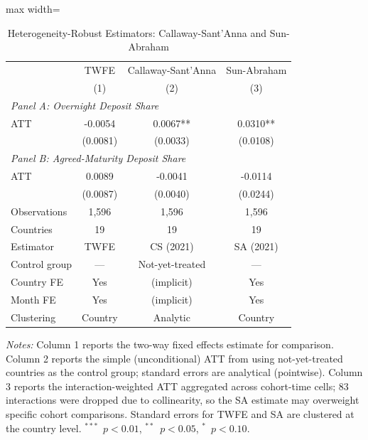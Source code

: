 \begin{table}[H]
\centering
\caption{Heterogeneity-Robust Estimators: Callaway-Sant'Anna and Sun-Abraham}
\label{tab:robust_estimators}
\begin{adjustbox}{max width=\textwidth}
\begin{tabular}{lccc}
\toprule
 & TWFE & Callaway-Sant'Anna & Sun-Abraham \\
 & (1) & (2) & (3) \\
\midrule
\multicolumn{4}{l}{\textit{Panel A: Overnight Deposit Share}} \\[3pt]
ATT & -0.0054 & 0.0067** & 0.0310** \\
 & (0.0081) & (0.0033) & (0.0108) \\
\midrule
\multicolumn{4}{l}{\textit{Panel B: Agreed-Maturity Deposit Share}} \\[3pt]
ATT & 0.0089 & -0.0041 & -0.0114 \\
 & (0.0087) & (0.0040) & (0.0244) \\
\midrule
Observations & 1,596 & 1,596 & 1,596 \\
Countries & 19 & 19 & 19 \\
Estimator & TWFE & CS (2021) & SA (2021) \\
Control group & --- & Not-yet-treated & --- \\
Country FE & Yes & (implicit) & Yes \\
Month FE & Yes & (implicit) & Yes \\
Clustering & Country & Analytic & Country \\
\bottomrule
\end{tabular}
\end{adjustbox}
\begin{tablenotes}[flushleft]
\small
\item \textit{Notes:} Column 1 reports the two-way fixed effects estimate for comparison. Column 2 reports the simple (unconditional) ATT from \citet{callaway2021difference} using not-yet-treated countries as the control group; standard errors are analytical (pointwise). Column 3 reports the \citet{sunab2021estimating} interaction-weighted ATT aggregated across cohort-time cells; 83 interactions were dropped due to collinearity, so the SA estimate may overweight specific cohort comparisons. Standard errors for TWFE and SA are clustered at the country level. $^{***}$~$p<0.01$, $^{**}$~$p<0.05$, $^{*}$~$p<0.10$.
\end{tablenotes}
\end{table}
